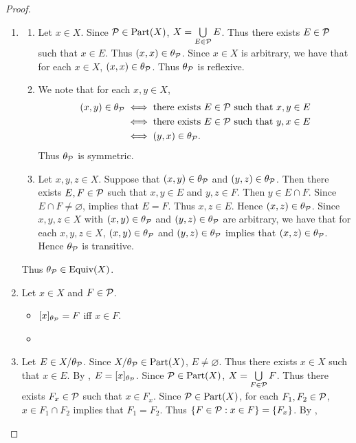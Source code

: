 \documentclass{book}
\begin{document}
	\begin{proof}\
		\begin{enumerate}
			\item 
			\begin{enumerate}
				\item Let $x \in X$. Since $\mathcal{P} \in \text{Part}(X)$, $X = \bigcup\limits_{E \in \mathcal{P}} E$. Thus there exists $E \in \mathcal{P}$ such that $x \in E$. Thus $(x,x) \in \theta_{\mathcal{P}}$. Since $x \in X$ is arbitrary, we have that for each $x \in X$, $(x,x) \in \theta_{\mathcal{P}}$. Thus $\theta_{\mathcal{P}}$ is reflexive. 
				\item We note that for each $x,y \in X$, 
				\begin{align*}
					(x,y) \in \theta_{\mathcal{P}}
					& \iff \text{there exists $E \in \mathcal{P}$ such that $x,y \in E$} \\
					& \iff \text{there exists $E \in \mathcal{P}$ such that $y,x \in E$} \\
					& \iff (y, x) \in \theta_{\mathcal{P}}. 
				\end{align*}
				Thus $\theta_{\mathcal{P}}$ is symmetric.
				\item Let $x,y,z \in X$. Suppose that $(x,y) \in \theta_{\mathcal{P}}$ and $(y,z) \in \theta_{\mathcal{P}}$. Then there exists $E, F \in \mathcal{P}$ such that $x,y \in E$ and $y,z \in F$. Then $y \in E \cap F$. Since $E \cap F \neq \varnothing$,  implies that $E = F$. Thus $x,z \in E$. Hence $(x,z) \in \theta_{\mathcal{P}}$. Since $x,y,z \in X$ with $(x,y) \in \theta_{\mathcal{P}}$ and $(y,z) \in \theta_{\mathcal{P}}$ are arbitrary, we have that for each $x,y,z \in X$, $(x,y) \in \theta_{\mathcal{P}}$ and $(y,z) \in \theta_{\mathcal{P}}$ implies that $(x,z) \in \theta_{\mathcal{P}}$. Hence $\theta_{\mathcal{P}}$ is transitive. 
			\end{enumerate}
			Thus $\theta_{\mathcal{P}} \in \operatorname*{\text{Equiv}}(X)$. 
			\item Let $x \in X$ and $F \in \mathcal{P}$. 
			\begin{itemize}
				\item $[x]_{\theta_{\mathcal{P}}} = F$ iff $x \in F$. 
				\item 
			\end{itemize}
			\item Let $E \in X/\theta_{\mathcal{P}}$. Since $X/\theta_{\mathcal{P}} \in \text{Part}(X)$, $E \neq \varnothing$. Thus there exists $x \in X$ such that $x \in E$. By , $E = [x]_{\theta_{\mathcal{P}}}$. Since $\mathcal{P} \in \text{Part}(X)$, $X = \bigcup\limits_{F \in \mathcal{P}} F$. Thus there exists $F_x \in \mathcal{P}$ such that $x \in F_x$. Since $\mathcal{P} \in \text{Part}(X)$, for each $F_1, F_2 \in \mathcal{P}$, $x \in F_1 \cap F_2$ implies that $F_1 = F_2$. Thus $\{F \in \mathcal{P}: x \in F\} = \{F_x\}$. By ,  

\end{enumerate}
\end{proof}
\end{document}
